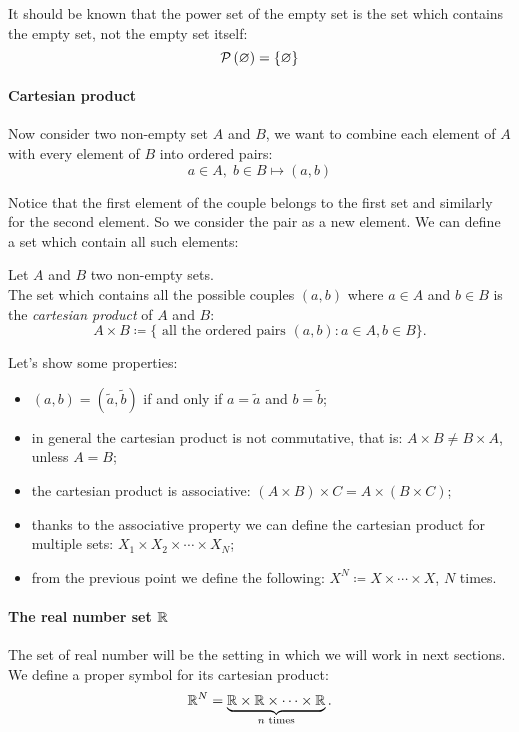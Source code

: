It should be known that the power set of the empty set is the set which contains the empty set, not the empty set itself:
$$\mathcal P\left(\varnothing\right)=\{\varnothing\}$$

\paragraph{Cartesian product} Now consider two non-empty set $A$ and $B$, we want to combine each element of $A$ with every element of $B$ into ordered pairs:
$$a\in A, \; b\in B \mapsto \left(a,b\right)$$

Notice that the first element of the couple belongs to the first set and similarly for the second element. So we consider the pair as a new element. We can define a set which contain all such elements:
\begin{defn}
	Let $A$ and $B$ two non-empty sets.\\
	The set which contains all the possible couples $(a,b)$ where $a\in A$ and $b \in B$ is the \emph{cartesian product} of $A$ and $B$:
	$$
		A \times B 
		\coloneqq \{\text{ all the ordered pairs } (a,b): a \in A, b \in B\}
	.
	$$
\end{defn}

Let's show some properties:
\begin{itemize}
	\item $(a,b) = (\tilde a, \tilde b)$ if and only if $a = \tilde{a}$ and $b = \tilde{b}$;
	\item in general the cartesian product is not commutative, that is: $A \times B \neq B \times A$, unless $A = B$;
	\item the cartesian product is associative: $(A \times B) \times C = A \times (B \times C)$;
	\item thanks to the associative property we can define the cartesian product for multiple sets: $X_1 \times X_2 \times \cdots \times X_N$;
	\item from the previous point we define the following: $X^N \coloneqq X \times \cdots \times X$, $N$ times.
\end{itemize}

\paragraph{The real number set $\mathbb R$} The set of real number will be the setting in which we will work in next sections. We define a proper symbol for its cartesian product:
$$
	\mathbb R^N 
	=\underbrace{\mathbb R \times \mathbb R \times \cdots \times \mathbb R}_{n \text{ times}}
.
$$